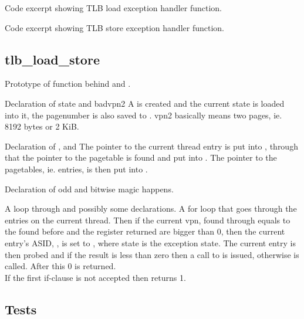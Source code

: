 {Code excerpt showing TLB load exception handler function.}

{Code excerpt showing TLB store exception handler function.}


\subsection{tlb\_load\_store}
    {Prototype of function behind  and
                          .}

    {Declaration of state and badvpn2}
A  is created and the current state is loaded
into it, the pagenumber is also saved to . vpn2
basically means two pages, ie. 8192 bytes or 2 KiB.


    {Declaration of ,  and }
The pointer to the current thread entry is put into , through
that the pointer to the pagetable is found and put into . The
pointer to the pagetables, ie. entries, is then put into .

    {Declaration of odd and bitwise magic happens.}

    {A loop through  and possibly some declarations.}
A for loop that goes through the entries on the current thread. Then if the
current vpn, found through  equals to the 
found before and the register returned are bigger than 0, then the current entry's ASID,
, is set to , where state is the
exception state. The current entry is then probed and if the result is less than
zero then a call to  is issued, otherwise
 is called. After this 0 is returned. \\
If the first if-clause is not accepted then 
returns 1.
\subsection{Tests}

